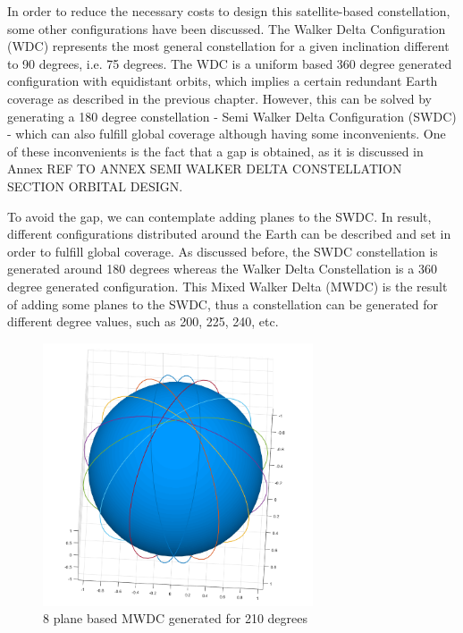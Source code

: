 In order to reduce the necessary costs to design this satellite-based constellation, some other configurations have been discussed. The Walker Delta Configuration (WDC) represents the most general constellation for a given inclination different to 90 degrees, i.e. 75 degrees. The WDC is a uniform based 360 degree generated configuration with equidistant orbits, which implies a certain redundant Earth coverage as described in the previous chapter. However, this can be solved by generating a 180 degree constellation - Semi Walker Delta Configuration (SWDC) - which can also fulfill global coverage although having some inconvenients. One of these inconvenients is the fact that a gap is obtained, as it is discussed in Annex REF TO ANNEX SEMI WALKER DELTA CONSTELLATION SECTION ORBITAL DESIGN.

To avoid the gap, we can contemplate adding planes to the SWDC. In result, different configurations distributed around the Earth can be described and set in order to fulfill global coverage. As discussed before, the SWDC constellation is generated around 180 degrees whereas the Walker Delta Constellation is a 360 degree generated configuration. This Mixed Walker Delta (MWDC) is the result of adding some planes to the SWDC, thus a constellation can be generated for different degree values, such as 200, 225, 240, etc. 

\begin{figure}[h]
\includegraphics[width=8cm]{MWDC}
\centering
\caption{8 plane based MWDC generated for 210 degrees}
\end{figure}